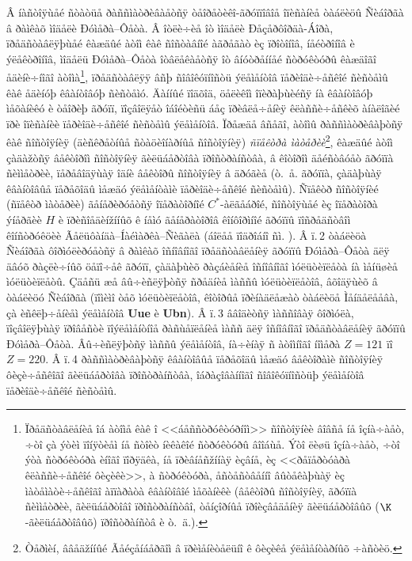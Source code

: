 Â íàñòîÿùåé ñòàòüå ðàññìàòðèâàåòñÿ òåîðåòèêî-ãðóïïîâîå îïèñàíèå òàáëèöû Ñèáîðãà â ðàìêàõ ìîäåëè Ðóìåðà--Ôåòà. Â îòëè÷èå îò ìîäåëè Ðåçåðôîðäà-Áîðà, ïðåäñòàâëÿþùåé êàæäûé àòîì êàê ñîñòàâíîé àãðåãàò èç ïðîòîíîâ, íåéòðîíîâ è ýëåêòðîíîâ, ìîäåëü Ðóìåðà--Ôåòà îòâëåêàåòñÿ îò âíóòðåííåé ñòðóêòóðû êàæäîãî åäèíè÷íîãî àòîìà\footnote{Ïðåäñòàâëåíèå îá àòîìå êàê î <<áåññòðóêòóðíîì>> ñîñòîÿíèè âîâñå íå îçíà÷àåò, ÷òî çà ýòèì ïîíÿòèåì íå ñòîèò íèêàêîé ñòðóêòóðû âîîáùå. Ýòî ëèøü îçíà÷àåò, ÷òî ýòà ñòðóêòóðà èíîãî ïîðÿäêà, íå ïðèâíåñžííàÿ èçâíå, èç <<ðåïåðòóàðà êëàññè÷åñêîé ôèçèêè>>, à ñòðóêòóðà, åñòåñòâåííî âûòåêàþùàÿ èç ìàòåìàòè÷åñêîãî àïïàðàòà êâàíòîâîé ìåõàíèêè (âåêòîðû ñîñòîÿíèÿ, ãðóïïà ñèììåòðèè, ãèëüáåðòîâî ïðîñòðàíñòâî, òåíçîðíûå ïðîèçâåäåíèÿ ãèëüáåðòîâûõ ($\K$-ãèëüáåðòîâûõ) ïðîñòðàíñòâ è ò.~ä.).}, ïðåäñòàâëÿÿ âñþ ñîâîêóïíîñòü ýëåìåíòîâ ïåðèîäè÷åñêîé ñèñòåìû êàê åäèíóþ êâàíòîâóþ ñèñòåìó. Äàííûé ïîäõîä, öåëèêîì îïèðàþùèéñÿ íà êâàíòîâóþ ìåõàíèêó è òåîðèþ ãðóïï, ïîçâîëÿåò îáîéòèñü áåç ïðèâëå÷åíèÿ êëàññè÷åñêèõ àíàëîãèé ïðè îïèñàíèè ïåðèîäè÷åñêîé ñèñòåìû ýëåìåíòîâ. Ïðåæäå âñåãî, àòîìû ðàññìàòðèâàþòñÿ êàê ñîñòîÿíèÿ (äèñêðåòíûå ñòàöèîíàðíûå ñîñòîÿíèÿ) \textit{ñïåêòðà ìàòåðèè}\footnote{Òåðìèí, ââåäžííûé Ãåéçåíáåðãîì â \cite{Heisen3} ïðèìåíèòåëüíî ê ôèçèêå ýëåìåíòàðíûõ ÷àñòèö.}, êàæäûé àòîì çàäàžòñÿ âåêòîðîì ñîñòîÿíèÿ ãèëüáåðòîâà ïðîñòðàíñòâà, â êîòîðîì äåéñòâóåò ãðóïïà ñèììåòðèè, ïåðåâîäÿùàÿ îäíè âåêòîðû ñîñòîÿíèÿ â äðóãèå (ò.~å. ãðóïïà, çàäàþùàÿ êâàíòîâûå ïåðåõîäû ìåæäó ýëåìåíòàìè ïåðèîäè÷åñêîé ñèñòåìû). Ñïåêòð ñîñòîÿíèé (ñïåêòð ìàòåðèè) ãåíåðèðóåòñÿ îïåðàòîðíîé $C^\ast$-àëãåáðîé, ñîñòîÿùåé èç îïåðàòîðà ýíåðãèè $H$ è ïðèñîåäèížííûõ ê íåìó ãåíåðàòîðîâ êîíôîðìíîé ãðóïïû ïîñðåäñòâîì êîíñòðóêöèè Ãåëüôàíäà--Íàéìàðêà--Ñèãàëà (áîëåå ïîäðîáíî ñì. \cite{Var18}). Â ï.\,2 òàáëèöà Ñèáîðãà ôîðìóëèðóåòñÿ â ðàìêàõ îñíîâíîãî ïðåäñòàâëåíèÿ ãðóïïû Ðóìåðà--Ôåòà äëÿ äâóõ ðàçëè÷íûõ öåïî÷åê ãðóïï, çàäàþùèõ ðàçáèåíèå îñíîâíîãî ìóëüòèïëåòà íà ìåíüøèå ìóëüòèïëåòû. Çäåñü æå âû÷èñëÿþòñÿ ñðåäíèå ìàññû ìóëüòèïëåòîâ, âõîäÿùèõ â òàáëèöó Ñèáîðãà (ïîìèìî òåõ ìóëüòèïëåòîâ, êîòîðûå ïðèíàäëåæàò òàáëèöå Ìåíäåëååâà, çà èñêëþ÷åíèåì ýëåìåíòîâ \textbf{Uue} è \textbf{Ubn}). Â ï.\,3 ââîäèòñÿ ìàññîâàÿ ôîðìóëà, ïîçâîëÿþùàÿ ïðîâåñòè ïîýëåìåíòíîå ðàñùåïëåíèå ìàññ äëÿ îñíîâíîãî ïðåäñòàâëåíèÿ ãðóïïû Ðóìåðà--Ôåòà. Âû÷èñëÿþòñÿ ìàññû ýëåìåíòîâ, íà÷èíàÿ ñ àòîìíîãî íîìåðà $Z=121$ ïî $Z=220$. Â ï.\,4 ðàññìàòðèâàþòñÿ êâàíòîâûå ïåðåõîäû ìåæäó âåêòîðàìè ñîñòîÿíèÿ ôèçè÷åñêîãî ãèëüáåðòîâà ïðîñòðàíñòâà, îáðàçîâàííîãî ñîâîêóïíîñòüþ ýëåìåíòîâ ïåðèîäè÷åñêîé ñèñòåìû.

